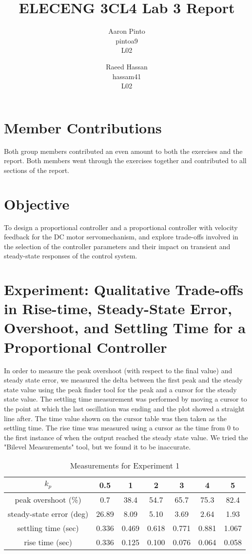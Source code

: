 \documentclass[12pt]{article}
\title{ELECENG 3CL4 Lab 3 Report}
\author{
    Aaron Pinto \\
    pintoa9 \\
    L02
    \and
    Raeed Hassan \\
    hassam41 \\
    L02
}
\begin{document}
\maketitle
\clearpage

\section*{Member Contributions} %
Both group members contributed an even amount to both the exercises and the report. Both members went through the exercises together and contributed to all sections of the report.

\section*{Objective}
To design a proportional controller and a proportional controller with velocity feedback for the DC motor servomechanism, and explore trade-offs involved in the selection of the controller parameters and their impact on transient and steady-state responses of the control system.

\setcounter{section}{2}
\section{Experiment: Qualitative Trade-offs in Rise-time, Steady-State Error, Overshoot, and Settling Time for a Proportional Controller}
In order to measure the peak overshoot (with respect to the final value) and steady state error, we measured the delta between the first peak and the steady state value using the peak finder tool for the peak and a cursor for the steady state value. The settling time measurement was performed by moving a cursor to the point at which the last oscillation was ending and the plot showed a straight line after. The time value shown on the cursor table was then taken as the settling time. The rise time was measured using a cursor as the time from 0 to the first instance of when the output reached the steady state value. We tried the "Bilevel Measurements" tool, but we found it to be inaccurate.

\begin{table}[h!]
\centering
\begin{tabular}{|c|c|c|c|c|c|c|} \hline
    $k_p$ & 0.5 & 1 & 2 & 3 & 4 & 5 \\ \hline
    peak overshoot (\%) & 0.7 & 38.4 & 54.7 & 65.7 & 75.3 & 82.4 \\ \hline
    steady-state error (deg) & 26.89 & 8.09 & 5.10 & 3.69 & 2.64 & 1.93 \\ \hline
    settling time (sec) & 0.336 & 0.469 & 0.618 & 0.771 & 0.881 & 1.067 \\ \hline
    rise time (sec) & 0.336 & 0.125 & 0.100 & 0.076 & 0.064 & 0.058 \\ \hline
\end{tabular}
\caption{\label{table:exp1_measurements}Measurements for Experiment 1}
\end{table}
\end{document}
